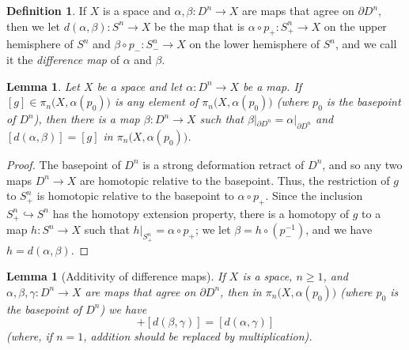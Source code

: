 \documentclass{amsart}
\numberwithin{equation}{section}
\theoremstyle{slplain}
\newtheorem{lem}[equation]{Lemma}
\theoremstyle{definition}
\newtheorem{defn}[equation]{Definition} %
\theoremstyle{remark}
\newcommand{\rest}[1]{|_{#1}}
\newcommand{\bdry}{\partial}
\begin{document}
\begin{defn}
  \label{def:diff}
  If $X$ is a space and $\alpha,\beta\colon D^{n} \to X$ are maps that
  agree on $\bdry D^{n}$, then we let $d(\alpha,\beta)\colon S^{n} \to
  X$ be the map that is $\alpha \circ p_{+}\colon S^{n}_{+} \to X$ on
  the upper hemisphere of $S^{n}$ and $\beta \circ p_{-}\colon
  S^{n}_{-} \to X$ on the lower hemisphere of $S^{n}$, and we call it
  the \emph{difference map} of $\alpha$ and $\beta$.
\end{defn}

\begin{lem}
  \label{lem:any}
  Let $X$ be a space and let $\alpha\colon D^{n} \to X$ be a map.  If
  $[g] \in \pi_{n}\bigl(X, \alpha(p_{0})\bigr)$ is any element of
  $\pi_{n}\bigl(X, \alpha(p_{0})\bigr)$ (where $p_{0}$ is the
  basepoint of $D^{n}$), then there is a map $\beta\colon D^{n} \to X$
  such that $\beta\rest{\bdry D^{n}} = \alpha\rest{\bdry D^{n}}$ and
  $[d(\alpha,\beta)] = [g]$ in $\pi_{n}\bigl(X, \alpha(p_{0})\bigr)$.
\end{lem}

\begin{proof}
  The basepoint of $D^{n}$ is a strong deformation retract of $D^{n}$,
  and so any two maps $D^{n} \to X$ are homotopic relative to the
  basepoint.  Thus, the restriction of $g$ to $S^{n}_{+}$ is homotopic
  relative to the basepoint to $\alpha \circ p_{+}$.  Since the
  inclusion $S^{n}_{+} \hookrightarrow S^{n}$ has the homotopy
  extension property, there is a homotopy of $g$ to a map $h\colon
  S^{n} \to X$ such that $h\rest{S^{n}_{+}} = \alpha \circ p_{+}$; we
  let $\beta = h \circ (p_{-}^{-1})$, and we have $h =
  d(\alpha,\beta)$.
\end{proof}

\begin{lem}[Additivity of difference maps]
  \label{lem:add}
  If $X$ is a space, $n \ge 1$, and $\alpha,\beta,\gamma\colon D^{n}
  \to X$ are maps that agree on $\bdry D^{n}$, then in
  $\pi_{n}\bigl(X, \alpha(p_{0})\bigr)$ (where $p_{0}$ is the
  basepoint of $D^{n}$) we have
  \begin{displaymath}
    [d(\alpha,\beta)] + [d(\beta,\gamma)] = [d(\alpha,\gamma)]
  \end{displaymath}
  (where, if $n = 1$, addition should be replaced by multiplication).
\end{lem}
\end{document}
